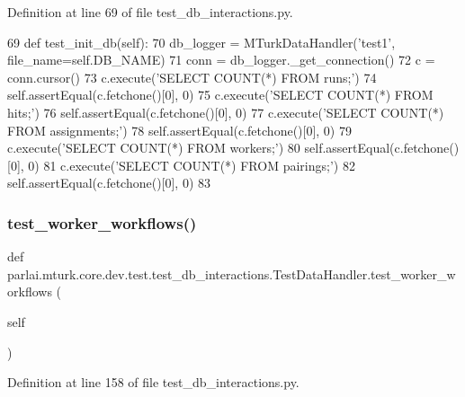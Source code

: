 Definition at line 69 of file test\+\_\+db\+\_\+interactions.\+py.


\begin{DoxyCode}
69     \textcolor{keyword}{def }test\_init\_db(self):
70         db\_logger = MTurkDataHandler(\textcolor{stringliteral}{'test1'}, file\_name=self.DB\_NAME)
71         conn = db\_logger.\_get\_connection()
72         c = conn.cursor()
73         c.execute(\textcolor{stringliteral}{'SELECT COUNT(*) FROM runs;'})
74         self.assertEqual(c.fetchone()[0], 0)
75         c.execute(\textcolor{stringliteral}{'SELECT COUNT(*) FROM hits;'})
76         self.assertEqual(c.fetchone()[0], 0)
77         c.execute(\textcolor{stringliteral}{'SELECT COUNT(*) FROM assignments;'})
78         self.assertEqual(c.fetchone()[0], 0)
79         c.execute(\textcolor{stringliteral}{'SELECT COUNT(*) FROM workers;'})
80         self.assertEqual(c.fetchone()[0], 0)
81         c.execute(\textcolor{stringliteral}{'SELECT COUNT(*) FROM pairings;'})
82         self.assertEqual(c.fetchone()[0], 0)
83 
\end{DoxyCode}
\mbox{\label{classparlai_1_1mturk_1_1core_1_1dev_1_1test_1_1test__db__interactions_1_1TestDataHandler_ae2fb8890a053c2c5bb84f0a27c021140}} 
\subsubsection{\texorpdfstring{test\+\_\+worker\+\_\+workflows()}{test\_worker\_workflows()}}
{\footnotesize\ttfamily def parlai.\+mturk.\+core.\+dev.\+test.\+test\+\_\+db\+\_\+interactions.\+Test\+Data\+Handler.\+test\+\_\+worker\+\_\+workflows (\begin{DoxyParamCaption}\item[{}]{self }\end{DoxyParamCaption})}



Definition at line 158 of file test\+\_\+db\+\_\+interactions.\+py.


